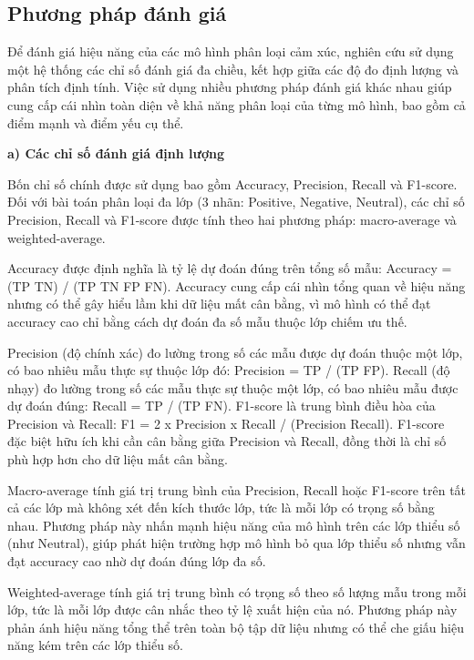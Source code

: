 \documentclass[14pt, a4paper]{report}
\begin{document}
\subsection{Phương pháp đánh giá}


Để đánh giá hiệu năng của các mô hình phân loại cảm xúc, nghiên cứu sử dụng một hệ thống các chỉ số đánh giá đa chiều, kết hợp giữa các độ đo định lượng và phân tích định tính. Việc sử dụng nhiều phương pháp đánh giá khác nhau giúp cung cấp cái nhìn toàn diện về khả năng phân loại của từng mô hình, bao gồm cả điểm mạnh và điểm yếu cụ thể.


\textbf{a) Các chỉ số đánh giá định lượng}


Bốn chỉ số chính được sử dụng bao gồm Accuracy, Precision, Recall và F1-score. Đối với bài toán phân loại đa lớp (3 nhãn: Positive, Negative, Neutral), các chỉ số Precision, Recall và F1-score được tính theo hai phương pháp: macro-average và weighted-average.


Accuracy được định nghĩa là tỷ lệ dự đoán đúng trên tổng số mẫu: Accuracy = (TP \+ TN) / (TP \+ TN \+ FP \+ FN). Accuracy cung cấp cái nhìn tổng quan về hiệu năng nhưng có thể gây hiểu lầm khi dữ liệu mất cân bằng, vì mô hình có thể đạt accuracy cao chỉ bằng cách dự đoán đa số mẫu thuộc lớp chiếm ưu thế.


Precision (độ chính xác) đo lường trong số các mẫu được dự đoán thuộc một lớp, có bao nhiêu mẫu thực sự thuộc lớp đó: Precision = TP / (TP \+ FP). Recall (độ nhạy) đo lường trong số các mẫu thực sự thuộc một lớp, có bao nhiêu mẫu được dự đoán đúng: Recall = TP / (TP \+ FN). F1-score là trung bình điều hòa của Precision và Recall: F1 = 2 x Precision x Recall / (Precision \+ Recall). F1-score đặc biệt hữu ích khi cần cân bằng giữa Precision và Recall, đồng thời là chỉ số phù hợp hơn cho dữ liệu mất cân bằng.


Macro-average tính giá trị trung bình của Precision, Recall hoặc F1-score trên tất cả các lớp mà không xét đến kích thước lớp, tức là mỗi lớp có trọng số bằng nhau. Phương pháp này nhấn mạnh hiệu năng của mô hình trên các lớp thiểu số (như Neutral), giúp phát hiện trường hợp mô hình bỏ qua lớp thiểu số nhưng vẫn đạt accuracy cao nhờ dự đoán đúng lớp đa số.


Weighted-average tính giá trị trung bình có trọng số theo số lượng mẫu trong mỗi lớp, tức là mỗi lớp được cân nhắc theo tỷ lệ xuất hiện của nó. Phương pháp này phản ánh hiệu năng tổng thể trên toàn bộ tập dữ liệu nhưng có thể che giấu hiệu năng kém trên các lớp thiểu số.
\end{document}
